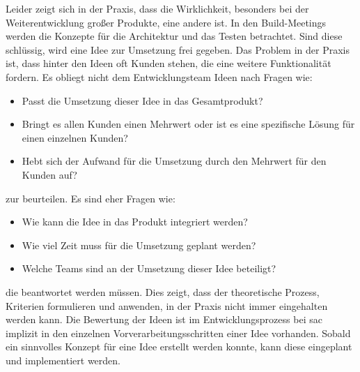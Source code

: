 Leider zeigt sich in der Praxis, dass die Wirklichkeit, besonders bei der Weiterentwicklung großer Produkte, eine andere ist. 
In den Build-Meetings werden die Konzepte für die Architektur und das Testen betrachtet. Sind diese schlüssig, wird eine Idee zur Umsetzung frei gegeben. 
Das Problem in der Praxis ist, dass hinter den Ideen oft Kunden stehen, die eine weitere Funktionalität fordern. Es obliegt nicht 
dem Entwicklungsteam Ideen nach Fragen wie: 
\begin{itemize}
    \item Passt die Umsetzung dieser Idee in das Gesamtprodukt?
    \item Bringt es allen Kunden einen Mehrwert oder ist es eine spezifische Lösung für einen einzelnen Kunden?
    \item Hebt sich der Aufwand für die Umsetzung durch den Mehrwert für den Kunden auf?
\end{itemize}
zur beurteilen. Es sind eher Fragen wie: 
\begin{itemize}
    \item Wie kann die Idee in das Produkt integriert werden?
    \item Wie viel Zeit muss für die Umsetzung geplant werden? 
    \item Welche Teams sind an der Umsetzung dieser Idee beteiligt?
\end{itemize}
die beantwortet werden müssen. 
Dies zeigt, dass der theoretische Prozess, Kriterien formulieren und anwenden, in der Praxis nicht immer eingehalten werden kann.
Die Bewertung der Ideen ist im Entwicklungsprozess bei \ac{sac} implizit in den einzelnen Vorverarbeitungsschritten einer Idee vorhanden.
Sobald ein sinnvolles Konzept für eine Idee erstellt werden konnte, kann diese eingeplant und implementiert werden.
